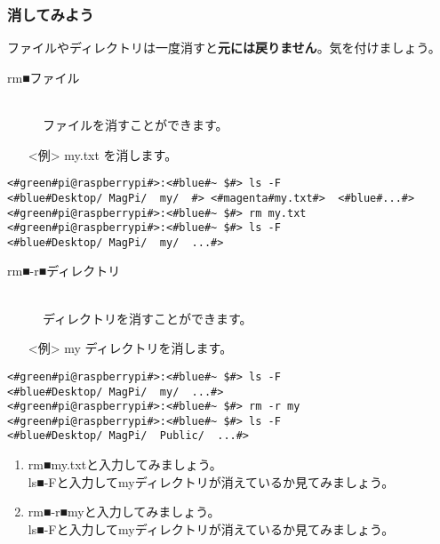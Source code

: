 \subsubsection{消してみよう}
ファイルやディレクトリは一度消すと\textbf{元には戻りません}。気を付けましょう。
\begin{description}
\item[rm■ファイル]\mbox{}\\
ファイルを消すことができます。
\end{description}
\begin{itemize}
\item[<例>]my.txt を消します。
\end{itemize}
\begin{lstlisting}[caption=cpの例, label=cp]
<#green#pi@raspberrypi#>:<#blue#~ $#> ls -F
<#blue#Desktop/	MagPi/	my/	 #>	<#magenta#my.txt#>	<#blue#...#>
<#green#pi@raspberrypi#>:<#blue#~ $#> rm my.txt
<#green#pi@raspberrypi#>:<#blue#~ $#> ls -F
<#blue#Desktop/	MagPi/	my/	 ...#>
\end{lstlisting}
\begin{description}
\item[rm■-r■ディレクトリ]\mbox{}\\
ディレクトリを消すことができます。
\end{description}
\begin{itemize}
\item[<例>]my ディレクトリを消します。
\end{itemize}
\begin{lstlisting}[caption=cp -rの例, label=cp-R]
<#green#pi@raspberrypi#>:<#blue#~ $#> ls -F
<#blue#Desktop/	MagPi/	my/	 ...#>
<#green#pi@raspberrypi#>:<#blue#~ $#> rm -r my
<#green#pi@raspberrypi#>:<#blue#~ $#> ls -F
<#blue#Desktop/	MagPi/	Public/	 ...#>
\end{lstlisting}
\begin{tcolorbox}[title=\useOmetoi]
\begin{enumerate}
\item rm■my.txtと入力してみましょう。\\ls■-Fと入力してmyディレクトリが消えているか見てみましょう。\\
\item rm■-r■myと入力してみましょう。\\ls■-Fと入力してmyディレクトリが消えているか見てみましょう。\\
\end{enumerate}
\end{tcolorbox}